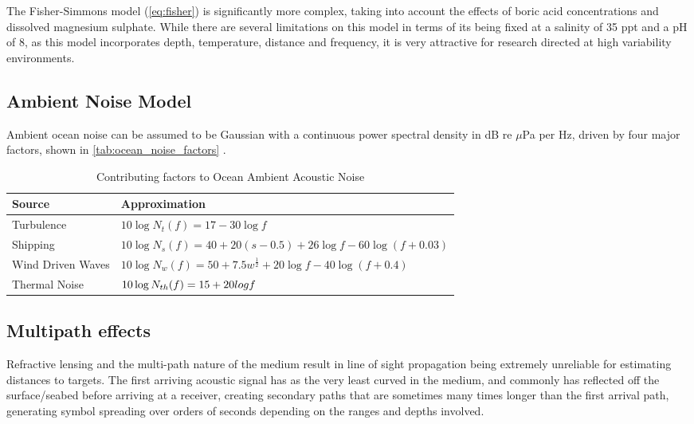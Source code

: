 %
The Fisher-Simmons model (\autoref{eq:fisher}) is significantly more complex, taking into account the effects of boric acid concentrations and dissolved magnesium sulphate. While there are several limitations on this model in terms of its being fixed at a salinity of 35 ppt and a pH of 8, as this model incorporates depth, temperature, distance and frequency, it is very attractive for research directed at high variability environments.



 \subsection{Ambient Noise Model}

 Ambient ocean noise can be assumed to be Gaussian with a continuous power spectral density in dB re $\mu$Pa per Hz, driven by four major factors, shown in \autoref{tab:ocean_noise_factors} \cite{coates1989}.
\begin{table}\centering
  \caption{Contributing factors to Ocean Ambient Acoustic Noise}
  \label{tab:ocean_noise_factors}
  \begin{tabularx}{\textwidth}{p{3.5cm} X}\toprule
    Source & Approximation \\ \midrule
    Turbulence & $10 \log N_t(f)=17-30\log f$\\
    Shipping & $10 \log N_s(f) = 40+20(s-0.5)+26\log f-60\log(f+0.03)$\\
    Wind Driven Waves & $10\log N_w(f) = 50+7.5w^{\frac{1}{2}}+20\log f - 40\log(f+0.4)$\\ 
    Thermal Noise & $10\log N_{th}(f) = \-15 + 20 log f$\\\bottomrule
  \end{tabularx}
\end{table}

\subsection{Multipath effects}

Refractive lensing and the multi-path nature of the medium result in line of sight propagation being extremely unreliable for estimating distances to targets.
The first arriving acoustic signal has as the very least curved in the medium, and commonly has reflected off the surface/seabed before arriving at a receiver, creating secondary paths that are sometimes many times longer than the first arrival path, generating symbol spreading over orders of seconds depending on the ranges and depths involved.


